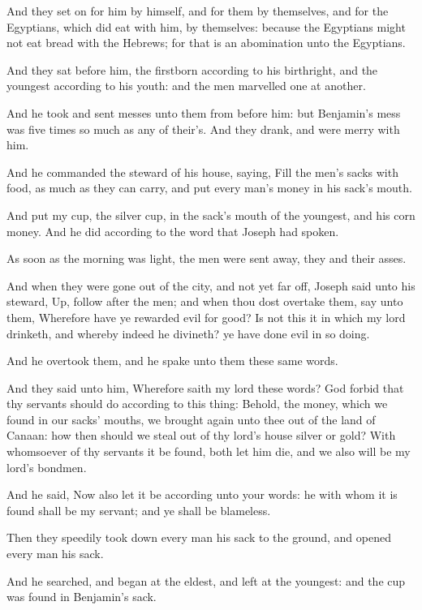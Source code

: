 \Verse And they set on for him by himself, and for them by themselves, and for the Egyptians, which did eat with him, by themselves: because the Egyptians might not eat bread with the Hebrews; for that is an abomination unto the Egyptians.

\Verse And they sat before him, the firstborn according to his birthright, and the youngest according to his youth: and the men marvelled one at another.

\Verse And he took and sent messes unto them from before him: but Benjamin's mess was five times so much as any of their's. And they drank, and were merry with him.

\Chapter
\Verse And he commanded the steward of his house, saying, Fill the men's sacks with food, as much as they can carry, and put every man's money in his sack's mouth.

\Verse And put my cup, the silver cup, in the sack's mouth of the youngest, and his corn money. And he did according to the word that Joseph had spoken.

\Verse As soon as the morning was light, the men were sent away, they and their asses.

\Verse And when they were gone out of the city, and not yet far off, Joseph said unto his steward, Up, follow after the men; and when thou dost overtake them, say unto them, Wherefore have ye rewarded evil for good?  \Verse Is not this it in which my lord drinketh, and whereby indeed he divineth? ye have done evil in so doing.

\Verse And he overtook them, and he spake unto them these same words.

\Verse And they said unto him, Wherefore saith my lord these words? God forbid that thy servants should do according to this thing: \Verse Behold, the money, which we found in our sacks' mouths, we brought again unto thee out of the land of Canaan: how then should we steal out of thy lord's house silver or gold?  \Verse With whomsoever of thy servants it be found, both let him die, and we also will be my lord's bondmen.

\Verse And he said, Now also let it be according unto your words: he with whom it is found shall be my servant; and ye shall be blameless.

\Verse Then they speedily took down every man his sack to the ground, and opened every man his sack.

\Verse And he searched, and began at the eldest, and left at the youngest: and the cup was found in Benjamin's sack.

